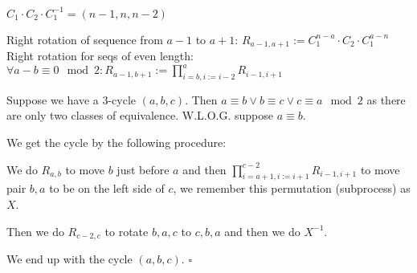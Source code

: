 \documentclass[11pt]{article}
\begin{document}
    $C_1 \cdot C_2 \cdot C_1^{-1} = (n-1, n, n-2)$

    Right rotation of sequence from $a-1$ to $a+1$: $R_{a-1,a+1} := C_1^{n-a} \cdot C_2 \cdot C_1^{a-n}$ \\
    Right rotation for seqs of even length: $\forall a-b \equiv 0 \mod 2: R_{a-1, b+1} := \prod\limits_{i = b, i:=i-2}^a R_{i-1,i+1}$

    Suppose we have a 3-cycle $(a, b, c)$. Then $a \equiv b \vee b \equiv c \vee c \equiv a \mod 2$ as there are only two classes of equivalence. W.L.O.G. suppose $a \equiv b$.

    We get the cycle by the following procedure:

    We do $R_{a,b}$ to move $b$ just before $a$ and then $\prod\limits_{i=a+1,i:=i+1}^{c-2} R_{i-1,i+1}$ to move pair $b,a$ to be on the left side of $c$, we remember this permutation (subprocess) as $X$.

    Then we do $R_{c-2,c}$ to rotate $b,a,c$ to $c,b,a$ and then we do $X^{-1}$.

    We end up with the cycle $(a,b,c)$. $\square$
\end{document}
